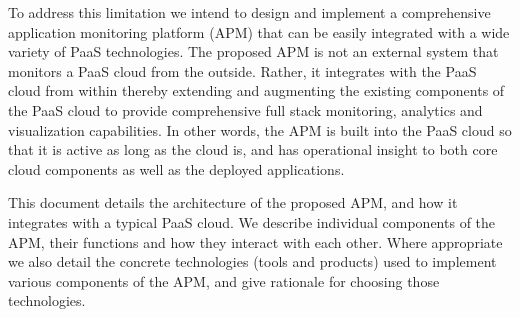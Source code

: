 \documentclass[11pt]{report}
\begin{document}
To address this limitation we intend to design and implement a comprehensive application monitoring 
platform (APM) that can be easily integrated with a wide variety of PaaS technologies. The proposed
APM is not an external system that monitors a PaaS cloud from the outside. Rather, it integrates with
the PaaS cloud from within thereby extending and augmenting the existing components of the PaaS cloud
to provide comprehensive full stack monitoring, analytics and visualization capabilities. In other words,
the APM is built into the PaaS cloud so that it is active as long as the cloud is, and has operational
insight to both core cloud components as well as the deployed applications.

This document details the architecture of the proposed APM, and how it integrates with a typical PaaS
cloud. We describe individual components of the APM, their functions and how they interact with each
other. Where appropriate we also detail the concrete technologies (tools and products) used to implement
various components of the APM, and give rationale for choosing those technologies.
\end{document}
